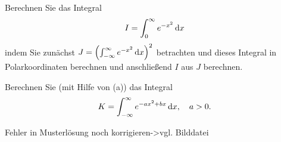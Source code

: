 \documentclass{atistandalonetask}
\begin{document}
  \begin{atiTask}[
    title = \textsc{Gauß}sche Integrale
  ]
    \begin{atiSubtasks}
    	\item Berechnen Sie das Integral
    	\[
    	I=\int_{0}^{\infty} e^{-x^2}\,\mathrm{d} x
    	\]
    	indem Sie zunächst $J=\left(\int_{-\infty}^{\infty} e^{-x^2}\,\mathrm{d} x\right)^2$ betrachten und dieses Integral in Polarkoordinaten berechnen und anschließend $I$ aus $J$ berechnen.
    	\item Berechnen Sie (mit Hilfe von (a)) das Integral
    	\[
    	K=\int_{-\infty}^{\infty} e^{-ax^2+bx}\,\mathrm{d} x,\quad a>0.
    	\]
    \end{atiSubtasks}	
  \end{atiTask}
  \begin{atiSolution}
  Fehler in Musterlösung noch korrigieren->vgl. Bilddatei
	 
  \end{atiSolution}
\end{document}
